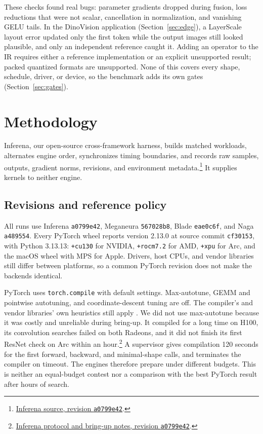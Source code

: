 \documentclass[conference]{IEEEtran}
\newcommand{\system}{Meganeura}
\newcommand{\inferena}{Inferena}
\newcommand{\code}[1]{\texttt{#1}}
\begin{document}
These checks found real bugs: parameter gradients dropped during fusion, loss
reductions that were not scalar, cancellation in normalization, and vanishing
GELU tails. In the DinoVision application (Section~\ref{sec:edge}), a
LayerScale layout error updated only the first token while the output images
still looked plausible, and only an independent reference caught it. Adding
an operator to the IR requires either a reference implementation or an
explicit unsupported result; packed quantized formats are unsupported. None
of this covers every shape, schedule, driver, or device, so the benchmark
adds its own gates (Section~\ref{sec:gates}).

\section{Methodology}
\label{sec:method}

\inferena{}, our open-source cross-framework harness, builds matched
workloads, alternates engine order, synchronizes timing boundaries, and
records raw samples, outputs, gradient norms, revisions, and environment
metadata.\footnote{\href{https://github.com/kvark/inferena/tree/a0799e4210eafa25161ec50d475b186c4b19d3da}{Inferena source, revision \code{a0799e42}}.}
It supplies kernels to neither engine.

\subsection{Revisions and reference policy}
\label{sec:reference-policy}

All runs use \inferena{} \code{a0799e42}, \system{} \code{567028b8}, Blade
\code{eae0c6f}, and Naga \code{a489554}. Every PyTorch wheel reports version 2.13.0 at source
commit \code{cf30153}, with Python 3.13.13: \code{+cu130} for NVIDIA,
\code{+rocm7.2} for AMD, \code{+xpu} for Arc, and the macOS wheel with MPS
for Apple. Drivers, host CPUs, and vendor libraries still differ between
platforms, so a common PyTorch revision does not make the backends identical.

PyTorch uses \code{torch.compile} with default settings. Max-autotune,
GEMM and pointwise autotuning, and coordinate-descent tuning are off. The
compiler's and vendor libraries' own heuristics still apply
\cite{pytorch2026compile}. We did not use max-autotune because it was costly
and unreliable during bring-up. It compiled for a long time on H100, its
convolution searches failed on both Radeons, and it did not finish its first
ResNet check on Arc within an hour.\footnote{\href{https://github.com/kvark/inferena/blob/a0799e4210eafa25161ec50d475b186c4b19d3da/EXPERIMENT.md}{Inferena protocol and bring-up notes, revision \code{a0799e42}}.}
A supervisor gives compilation 120 seconds for the first forward, backward,
and minimal-shape calls, and terminates the compiler on timeout. The engines
therefore prepare under different budgets. This is neither an equal-budget
contest nor a comparison with the best PyTorch result after hours of search.
\end{document}
